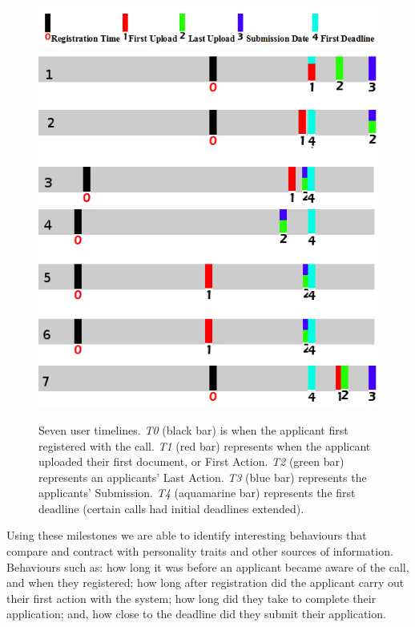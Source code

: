 \documentclass{AISB2008}
\begin{document}
\begin{figure}[!ht]
\centering
\includegraphics[width=\columnwidth]{images/legend.jpg}
\includegraphics[width=\columnwidth]{images/timelines.jpg}
\caption{Seven user timelines. {\emph{T0}} (black bar) is when the applicant first
registered with the call. {\emph{T1}} (red bar) represents when the applicant
uploaded their first document, or First Action. {\emph{T2}} (green bar)
represents an applicants' Last Action. {\emph{T3}} (blue bar) represents the
applicants' Submission. {\emph{T4}} (aquamarine bar) represents the first
deadline (certain calls had initial deadlines extended).}
\label{fig:timelines}
\end{figure}

Using these milestones we are able to identify interesting behaviours
that compare and contract with personality traits and other sources of
information. Behaviours such as: how long it was before an applicant
became aware of the call, and when they registered; how long after
registration did the applicant carry out their first action with the
system; how long did they take to complete their application; and, how
close to the deadline did they submit their application.
\end{document}
